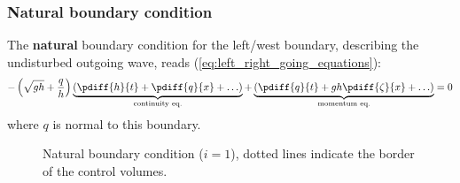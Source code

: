 \subsubsection{Natural boundary condition}
The \textbf{natural} boundary condition for the left/west boundary, describing the undisturbed outgoing wave, reads (\autoref{eq:left_right_going_equations}):
\begin{align}
    - \left(\sqrt{gh} + \frac{q}{h}\right) \underbrace{ \left(\pdiff{h}{t} + \pdiff{q}{x} + \ldots \right) }_{\text{continuity eq.}} + \underbrace{\left(\pdiff{q}{t} + g h \pdiff{\zeta}{x}+\ldots\right)}_{\text{momentum eq.}} = 0
\end{align}
where $q$ is normal to this boundary.
\begin{figure}[H]
    \begin{center}
        \def\svgwidth{0.80\textwidth} %
        \resizebox{0.65\textwidth}{!}{
            
        }
    \end{center}
    \caption{Natural boundary condition ($i=1$), dotted lines indicate the border of the control volumes.}
    \label{fig:structured_grid_along_straight_boundary_natural}
\end{figure}
